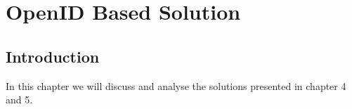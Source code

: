 \chapter{OpenID Based Solution}
\section{Introduction}
In this chapter we will discuss and analyse the solutions presented in chapter 4 and 5.
